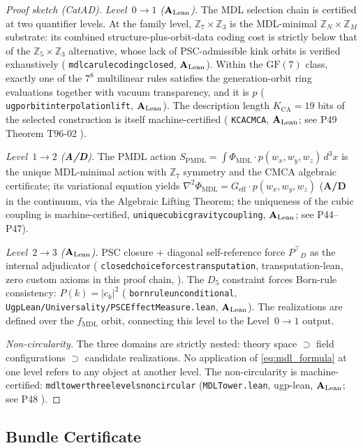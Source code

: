 \documentclass[11pt]{article}
\theoremstyle{remark}
\newcommand{\PHIMDL}{\ensuremath{\Phi_{\mathrm{MDL}}}}
\newcommand{\ZS}{\ensuremath{\mathbb{Z}_7}}
\newcommand{\GF}[1]{\ensuremath{\mathrm{GF}(#1)}}
\newcommand{\lean}[1]{%
  \penalty-100
  \begingroup\def\_{\textunderscore\allowbreak}\texttt{#1}\endgroup}
\newcommand{\fmdl}{\ensuremath{f_{\mathrm{MDL}}}}
\newcommand{\Ptop}{\ensuremath{P^{\top}}}
\newcommand{\CatAL}{\ensuremath{\textbf{A}_{\rm Lean}}}
\newcommand{\CatAD}{\textbf{A/D}}
\begin{document}
\begin{proof}[Proof sketch (CatAD)]
\textit{Level~$0\to1$ (\CatAL).} The MDL selection chain is certified at
two quantifier levels. At the family level,
$\mathbb{Z}_7 \times \mathbb{Z}_3$ is the MDL-minimal
$\mathbb{Z}_N \times \mathbb{Z}_M$ substrate: its combined
structure-plus-orbit-data coding cost is strictly below that of the
$\mathbb{Z}_5 \times \mathbb{Z}_3$ alternative, whose lack of
PSC-admissible kink orbits is verified exhaustively
(\lean{mdl\_ca\_rule\_coding\_closed}, \CatAL).
Within the $\GF{7}$ class, exactly one of the $7^8$ multilinear rules
satisfies the generation-orbit ring evaluations together with vacuum
transparency, and it is $p$
(\lean{ugp\_orbit\_interpolation\_lift}, \CatAL).
The description length $K_{\mathrm{CA}} = 19$ bits of the selected
construction is itself machine-certified (\lean{K\_CA\_CMCA}, \CatAL;
see P49 Theorem T96-02 \cite{SpivackGTEPolynomialWolfram}).

\textit{Level~$1\to2$ (\CatAD).} The PMDL action
$S_{\mathrm{PMDL}} = \int \PHIMDL \cdot p(w_x,w_y,w_z)\,d^3x$ is the unique
MDL-minimal action with $\ZS$ symmetry and the CMCA algebraic certificate;
its variational equation yields
$\nabla^2\PHIMDL = G_{\mathrm{eff}} \cdot p(w_x,w_y,w_z)$
(\CatAD{} in the continuum, via the Algebraic Lifting Theorem; the
uniqueness of the cubic coupling is machine-certified,
\lean{unique\_cubic\_gravity\_coupling}, \CatAL; see P44--P47).

\textit{Level~$2\to3$ (\CatAL).} PSC closure + diagonal self-reference force
$\Ptop_D$ as the internal adjudicator
(\lean{closed\_choice\_forces\_transputation},
transputation-lean, zero custom axioms in this proof chain, \cite{SpivackGTECompleteFramework}).
The $D_5$ constraint forces Born-rule consistency:
$P(k) = |c_k|^2$ (\lean{born\_rule\_unconditional},
\texttt{UgpLean/Universality/PSCEffectMeasure.lean}, \CatAL).
The realizations are defined over the \fmdl{} orbit, connecting this level
to the Level~$0\to1$ output.

\textit{Non-circularity.} The three domains are strictly nested:
theory space $\supset$ field configurations $\supset$ candidate realizations.
No application of \eqref{eq:mdl_formula} at one level refers to any object
at another level. The non-circularity is machine-certified:
\lean{mdl\_tower\_three\_levels\_non\_circular}
(\texttt{MDLTower.lean}, ugp-lean, \CatAL;
see P48 \cite{SpivackGTECompleteFramework}).
\end{proof}

\subsection{Bundle Certificate}
\label{sec:bundle_cert}
\end{document}
